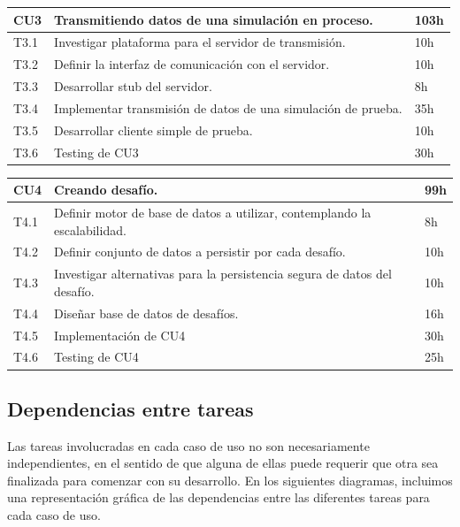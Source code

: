 \documentclass[a4paper, 10pt, twoside]{article}
\begin{document}
\vspace{1em}

\begin{tabular}{lp{13cm}l}
  \hline
  CU3 & Transmitiendo datos de una simulación en proceso. & 103h \\
  \hline
  T3.1 & Investigar plataforma para el servidor de transmisión. & 10h \\
  T3.2 & Definir la interfaz de comunicación con el servidor. & 10h \\
  T3.3 & Desarrollar stub del servidor. & 8h \\
  T3.4 & Implementar transmisión de datos de una simulación de prueba. & 35h \\
  T3.5 & Desarrollar cliente simple de prueba. & 10h \\
  T3.6 & Testing de CU3 & 30h\\
  \hline
\end{tabular}

\vspace{1em}

\begin{tabular}{lp{13cm}l}
  \hline
  CU4 & Creando desafío. & 99h \\
  \hline
  T4.1 & Definir motor de base de datos a utilizar, contemplando la escalabilidad. & 8h \\
  T4.2 & Definir conjunto de datos a persistir por cada desafío. & 10h \\
  T4.3 & Investigar alternativas para la persistencia segura de datos del desafío. & 10h \\
  T4.4 & Diseñar base de datos de desafíos. & 16h \\
  T4.5 & Implementación de CU4 & 30h\\
  T4.6 & Testing de CU4 & 25h\\
  \hline
\end{tabular}

\subsection{Dependencias entre tareas}

Las tareas involucradas en cada caso de uso no son necesariamente independientes, en el sentido de que alguna de ellas puede requerir que otra sea finalizada para comenzar con su desarrollo. En los siguientes diagramas, incluimos una representación gráfica de las dependencias entre las diferentes tareas para cada caso de uso.
\end{document}
